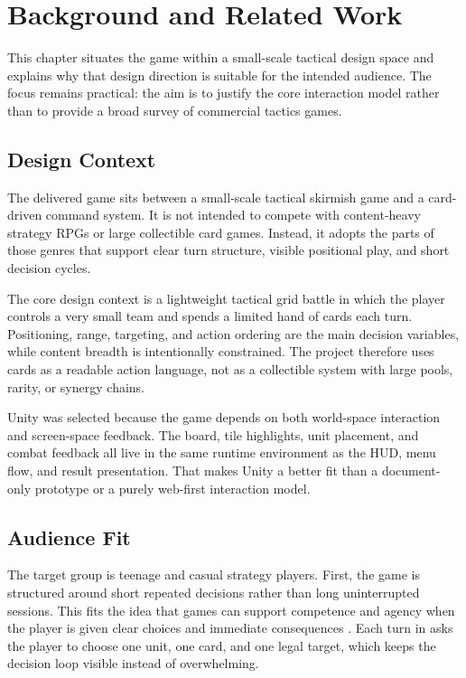\chapter{Background and Related Work}

This chapter situates the game within a small-scale tactical design space and explains why that design direction is suitable for the intended audience. The focus remains practical: the aim is to justify the core interaction model rather than to provide a broad survey of commercial tactics games.

\section{Design Context}

The delivered game sits between a small-scale tactical skirmish game and a card-driven command system. It is not intended to compete with content-heavy strategy RPGs or large collectible card games. Instead, it adopts the parts of those genres that support clear turn structure, visible positional play, and short decision cycles.

The core design context is a lightweight tactical grid battle in which the player controls a very small team and spends a limited hand of cards each turn. Positioning, range, targeting, and action ordering are the main decision variables, while content breadth is intentionally constrained. The project therefore uses cards as a readable action language, not as a collectible system with large pools, rarity, or synergy chains.

Unity was selected because the game depends on both world-space interaction and screen-space feedback. The board, tile highlights, unit placement, and combat feedback all live in the same runtime environment as the HUD, menu flow, and result presentation. That makes Unity a better fit than a document-only prototype or a purely web-first interaction model.

\section{Audience Fit}

The target group is teenage and casual strategy players. First, the game is structured around short repeated decisions rather than long uninterrupted sessions. This fits the idea that games can support competence and agency when the player is given clear choices and immediate consequences \cite{ryan2006motivationalpull}. Each turn in \projectname{} asks the player to choose one unit, one card, and one legal target, which keeps the decision loop visible instead of overwhelming.

